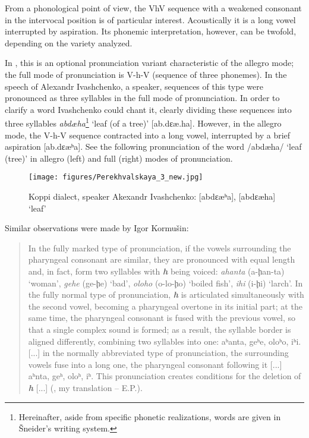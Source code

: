 \documentclass[output=paper,colorlinks,citecolor=brown]{langscibook}
\begin{document}
From a phonological point of view, the VhV sequence with a weakened consonant in the intervocal position is of particular interest. Acoustically it is a long vowel interrupted by aspiration. Its phonemic interpretation, however, can be twofold, depending on the variety analyzed.

In , this is an optional pronunciation variant characteristic of the allegro mode; the full mode of pronunciation is V-h-V (sequence of three phonemes). In the speech of Alexandr Ivashchenko, a  speaker, sequences of this type were pronounced as three syllables in the full mode of pronunciation. In order to clarify a word Ivashchenko could chant it, clearly dividing these sequences into three syllables \textit{abdæha}\footnote{Hereinafter, aside from specific phonetic realizations,  words are given in Šneider’s writing system.} ‘leaf (of a tree)’ [ab.dɛæ.ha]. However, in the allegro mode, the V-h-V sequence contracted into a long vowel, interrupted by a brief aspiration [ab.dɛæʰa]. See the following pronunciation of the word /abdæha/ ‘leaf (tree)’ in allegro (left) and full (right) modes of pronunciation. 


\begin{figure}
\texttt{[image: figures/Perekhvalskaya\_3\_new.jpg]}
\caption{Koppi dialect, speaker Akexandr Ivashchenko: [abd{ɛ}æʰa], [abd{ɛ}æha] ‘leaf’}
\label{fig:7:3}
\end{figure}

Similar observations were made by Igor Kormušin:

\begin{quote}\sloppy 
In the fully marked type of pronunciation, if the vowels surrounding the pharyngeal consonant are similar, they are pronounced with equal length and, in fact, form two syllables with \textbf{\textit{h}} being voiced: \textit{ahanta} (a-{ḩ}an-ta) ‘woman’, \textit{gehe} (ge-{ḩ}e) ‘bad’, \textit{oloho} (o-lo-{ḩ}o) ‘boiled fish’, \textit{ihi} (i-{ḩ}i) ‘larch’. In the fully normal type of pronunciation, \textbf{\textit{h}} is articulated simultaneously with the second vowel, becoming a pharyngeal overtone in its initial part; at the same time, the pharyngeal consonant is fused with the previous vowel, so that a single complex sound is formed; as a result, the syllable border is aligned differently, combining two syllables into one: aʰanta, geʰe, oloʰo, iʰi. [...] in the normally abbreviated type of pronunciation, the surrounding vowels fuse into a long one, the pharyngeal consonant following it [...] aʰnta, geʰ, oloʰ, iʰ. This pronunciation creates conditions for the deletion of \textbf{\textit{h}} [...] (\citealt[64--65]{Kormushin1998}, my translation – E.P.). 
\end{quote}
\end{document}

